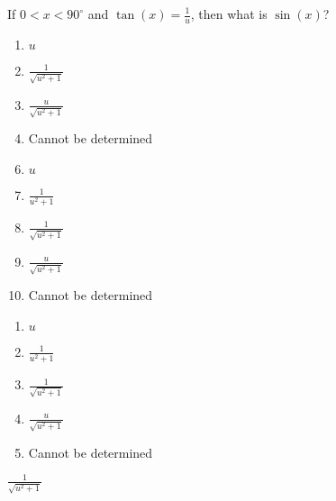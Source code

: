 


  If $0<x<90^\circ$ and $\tan(x)=\frac{1}{u}$, then what is $\sin(x)$?


\ifsat
	\begin{enumerate}[label=\Alph*)]
		\item    $u$
		\item $\frac{1}{\sqrt{u^{2}+1}}$ %
		\item $\frac{u}{\sqrt{u^{2}+1}}$
		\item  Cannot be determined
	\end{enumerate}
\else
\fi

\ifacteven
	\begin{enumerate}[label=\textbf{\Alph*.},itemsep=\fill,align=left]
		\setcounter{enumii}{5}
		\item    $u$
		\item  $\frac{1}{u^{2}+1}$ 
		\item $\frac{1}{\sqrt{u^{2}+1}}$ %
		\addtocounter{enumii}{1}
		\item $\frac{u}{\sqrt{u^{2}+1}}$
		\item  Cannot be determined
	\end{enumerate}
\else
\fi

\ifactodd
	\begin{enumerate}[label=\textbf{\Alph*.},itemsep=\fill,align=left]
		\item    $u$
		\item  $\frac{1}{u^{2}+1}$ 
		\item $\frac{1}{\sqrt{u^{2}+1}}$ %
		\item $\frac{u}{\sqrt{u^{2}+1}}$
		\item  Cannot be determined
	\end{enumerate}
\else
\fi

\ifgridin
 $\frac{1}{\sqrt{u^{2}+1}}$ %
		
\else
\fi


